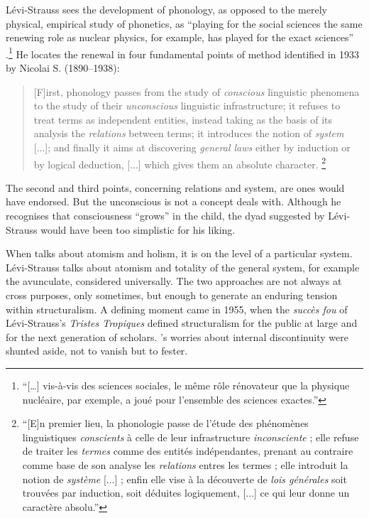 \documentclass[output=paper]{langscibook}
\begin{document}
Lévi-Strauss sees the development of phonology, as opposed to the merely physical, empirical study of phonetics, as ``playing for the social sciences the same renewing role as nuclear physics, for example, has played for the exact sciences'' \citep[35]{LeviStrauss1945}.\footnote{``[…] vis-à-vis des sciences sociales, le même rôle rénovateur que la physique nucléaire, par exemple, a joué pour l’ensemble des sciences exactes.''} He locates the renewal in four fundamental points of method identified in 1933 by Nicolai S. {\Trubetzkoy} (1890--1938):

\begin{quotation}
[F]irst, phonology passes from the study of \emph{conscious} linguistic phenomena to the study of their \emph{unconscious} linguistic infrastructure; it refuses to treat terms as independent entities, instead taking as the basis of its analysis the \emph{relations} between terms; it introduces the notion of \emph{system} [...]; and finally it aims at discovering \emph{general laws} either by induction or by logical deduction, [...] which gives them an absolute character. \citep[35]{LeviStrauss1945}\footnote{``[E]n premier lieu, la phonologie passe de l’étude des phénomènes linguistiques \emph{conscients} à celle de leur infrastructure \emph{inconsciente} ; elle refuse de traiter les \emph{termes} comme des entités indépendantes, prenant au contraire comme base de son analyse les \emph{relations} entres les termes ; elle introduit la notion de \emph{système} [...] ; enfin elle vise à la découverte de \emph{lois générales} soit trouvées par induction, soit déduites logiquement, [...] ce qui leur donne un caractère absolu.''}
\end{quotation}

The second and third points, concerning relations and system, are ones {\Cassirer} would have endorsed. But the unconscious is not a concept {\Cassirer} deals with. Although he recognises that consciousness ``grows'' in the child, the dyad suggested by Lévi-Strauss would have been too simplistic for his liking.

When {\Cassirer} talks about atomism and holism, it is on the level of a particular system. Lévi-Strauss talks about atomism and totality of the general system, for example the avunculate, considered universally. The two approaches are not always at cross purposes, only sometimes, but enough to generate an enduring tension within structuralism. A defining moment came in 1955, when the \emph{succès fou} of Lévi-Strauss’s \emph{Tristes Tropiques} defined structuralism for the public at large and for the next generation of scholars. {\Cassirer}’s worries about internal discontinuity were shunted aside, not to vanish but to fester.
\end{document}
